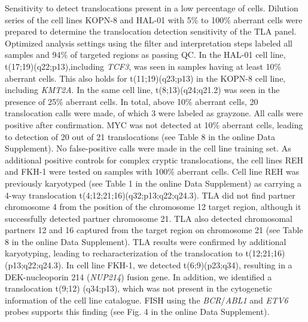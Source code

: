 Sensitivity to detect translocations present in a low percentage of cells. 
Dilution series of the cell lines KOPN-8 and HAL-01 with 5\% to 100\% aberrant cells were prepared to determine the translocation detection sensitivity of the TLA panel. 
Optimized analysis settings using the filter and interpretation steps labeled all samples and 94\% of targeted regions as passing QC. 
In the HAL-01 cell line, t(17;19)(q22;p13),including \textsl{TCF3}, was seen in samples having at least 10\% aberrant cells. 
This also holds for t(11;19)(q23;p13) in the KOPN-8 cell line, including \textsl{KMT2A}. In the same cell line, t(8;13)(q24;q21.2) was seen in the presence of 25\% aberrant cells. 
In total, above 10\% aberrant cells, 20 translocation calls were made, of which 3 were labeled as grayzone. All calls were positive after confirmation. 
MYC was not detected at 10\% aberrant cells, leading to detection of 20 out of 21 translocations (see Table 8 in the online Data Supplement). 
No false-positive calls were made in the cell line training set.
As additional positive controls for complex cryptic translocations, the cell lines REH and FKH-1 were tested on samples with 100\% aberrant cells. 
Cell line REH was previously karyotyped (see Table 1 in the online Data Supplement) as carrying a 4-way translocation t(4;12;21;16)(q32;p13;q22;q24.3)\cite{Leibniz_REH_2017}.
TLA did not find partner chromosome 4 from the position of the chromosome 12 target region, although it successfully detected partner chromosome 21. 
TLA also detected chromosomal partners 12 and 16 captured from the target region on chromosome 21 (see Table 8 in the online Data Supplement). 
TLA results were confirmed by additional karyotyping, leading to recharacterization of the translocation to t(12;21;16)(p13;q22;q24.3). 
In cell line FKH-1, we detected t(6;9)(p23;q34), resulting in a DEK-nucleoporin 214 (\textsl{NUP214}) fusion gene. 
In addition, we identified a translocation t(9;12) (q34;p13), which was not present in the cytogenetic information of the cell line catalogue\cite{Leibniz_FKH1_2017}. 
FISH using the \textsl{BCR}/\textsl{ABL1} and \textsl{ETV6} probes supports this finding (see Fig. 4 in the online Data Supplement).

